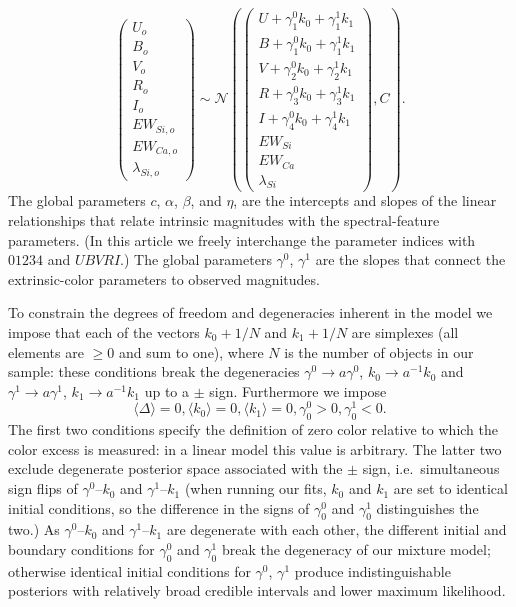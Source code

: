 \documentclass{aastex61}   	%
\begin{document}
\begin{equation}
\begin{pmatrix}
U_o\\B_o\\ V_o\\R_o\\I_o\\EW_{Si, o}\\ EW_{Ca, o} \\ \lambda_{Si, o}
\end{pmatrix}
\sim \mathcal{N}
\left(
\begin{pmatrix}
U +\gamma^0_{1} k_0 +\gamma^1_{1} k_1 \\B +\gamma^0_{1} k_0 +\gamma^1_{1} k_1 \\
V+\gamma^0_{2} k_0+\gamma^1_{2} k_1\\R+\gamma^0_{3} k_0 + \gamma^1_{3} k_1\\I+\gamma^0_{4} k_0+\gamma^1_{4} k_1\\
EW_{Si}\\ EW_{Ca} \\ \lambda_{Si}
\end{pmatrix}
,C
\right).
\label{dust:eqn}
\end{equation}
The global parameters $c$, $\alpha$, $\beta$,  and $\eta$,  are the intercepts and slopes of the linear relationships that
relate intrinsic magnitudes with the spectral-feature parameters.
(In this article we freely interchange the parameter indices with  $01234$ and $UBVRI$.)
The global parameters $\gamma^0$, $\gamma^1$  are the slopes that connect the extrinsic-color
parameters to observed magnitudes.

To constrain the degrees of freedom and degeneracies inherent in the model we impose that
each of the vectors $k_0+1/N$ and $k_1+1/N$ are simplexes (all elements are $\ge 0$ and sum to one),
where $N$ is the number of objects in our sample: these
conditions break the 
degeneracies  $\gamma ^0\rightarrow a\gamma^0$, $k_0 \rightarrow a^{-1}k_0$ and $\gamma^1 \rightarrow a\gamma^1$, $k_1 \rightarrow a^{-1}k_1$
up to a $\pm$ sign.
Furthermore we impose
\begin{equation}
\langle \Delta \rangle=0, \langle k_0 \rangle=0, \langle k_1 \rangle=0, \gamma^0_0 > 0, \gamma^1_0 < 0.
\end{equation}
The first two conditions specify the definition of zero color relative to which the color excess is measured:
in a linear model this value is arbitrary.
The latter two exclude degenerate posterior space
associated
with the $\pm$ sign, i.e.\ simultaneous sign flips of
$\gamma^0$--$k_0$ and $\gamma^1$--$k_1$
(when running our fits, $k_0$ and $k_1$ are set to
identical initial conditions, so the difference in the signs of $\gamma^0_0$ and $\gamma^1_0$ distinguishes the two.)
As  $\gamma^0$--$k_0$ and $\gamma^1$--$k_1$ are degenerate with
each other,
the different initial and boundary conditions for $\gamma^0_0$ and $\gamma^1_0$ break the degeneracy of our mixture model;
otherwise identical initial conditions for $\gamma^0$, $\gamma^1$ produce indistinguishable posteriors
with relatively broad credible intervals and lower maximum likelihood.
\end{document}
